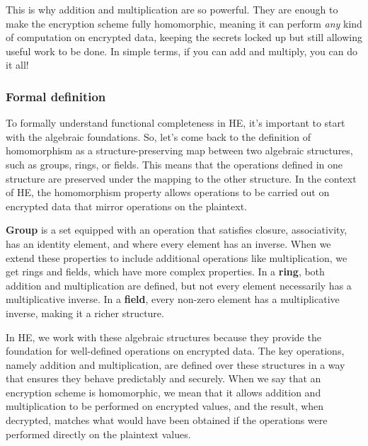 \documentclass[
  letterpaper,
  DIV=11,
  numbers=noendperiod,
  oneside]{scrartcl}
\begin{document}
This is why addition and multiplication are so powerful. They are enough
to make the encryption scheme fully homomorphic, meaning it can perform
\emph{any} kind of computation on encrypted data, keeping the secrets
locked up but still allowing useful work to be done. In simple terms, if
you can add and multiply, you can do it all!

\subsubsection{Formal definition}\label{formal-definition}

To formally understand functional completeness in HE, it's important to
start with the algebraic foundations. So, let's come back to the
definition of homomorphism as a structure-preserving map between two
algebraic structures, such as groups, rings, or fields. This means that
the operations defined in one structure are preserved under the mapping
to the other structure. In the context of HE, the homomorphism property
allows operations to be carried out on encrypted data that mirror
operations on the plaintext.

\textbf{Group} is a set equipped with an operation that satisfies
closure, associativity, has an identity element, and where every element
has an inverse. When we extend these properties to include additional
operations like multiplication, we get rings and fields, which have more
complex properties. In a \textbf{ring}, both addition and multiplication
are defined, but not every element necessarily has a multiplicative
inverse. In a \textbf{field}, every non-zero element has a
multiplicative inverse, making it a richer structure.

In HE, we work with these algebraic structures because they provide the
foundation for well-defined operations on encrypted data. The key
operations, namely addition and multiplication, are defined over these
structures in a way that ensures they behave predictably and securely.
When we say that an encryption scheme is homomorphic, we mean that it
allows addition and multiplication to be performed on encrypted values,
and the result, when decrypted, matches what would have been obtained if
the operations were performed directly on the plaintext values.
\end{document}
